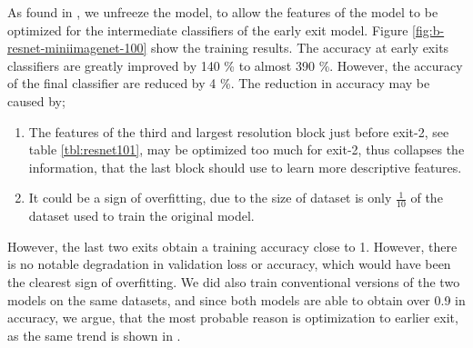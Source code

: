 As found in \cite{teerapittayanon_branchynet:_2016}, we unfreeze the model, to allow the features of the model to be optimized for the intermediate classifiers of the early exit model. Figure \ref{fig:b-resnet-miniimagenet-100} show the training results. The accuracy at early exits classifiers are greatly improved by 140 \% to almost 390 \%. However, the accuracy of the final classifier are reduced by 4 \%. The reduction in accuracy may be caused by;
\begin{enumerate}
	\item The features of the third and largest resolution block just before exit-2, see table \ref{tbl:resnet101}, may be optimized too much for exit-2, thus collapses the information, that the last block should use to learn more descriptive features. 
	\item It could be a sign of overfitting, due to the size of dataset is only $\frac{1}{10}$ of the dataset used to train the original model. 
\end{enumerate}
However, the last two exits obtain a training accuracy close to 1. However, there is no notable degradation in validation loss or accuracy, which would have been the clearest sign of overfitting. We did also train conventional versions of the two models on the same datasets, and since both models are able to obtain over 0.9 in accuracy, we argue, that the most probable reason is optimization to earlier exit, as the same trend is shown in \cite{huang_multi-scale_2017}.

